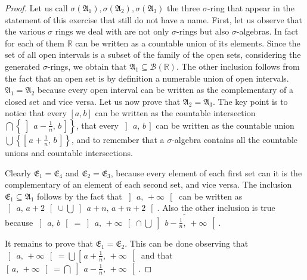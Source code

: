 \documentclass[12pt,a4paper]{article} %
\theoremstyle{plain}
\newcommand\A{\ensuremath{\mathfrak A}}                               %
\newcommand\E{\ensuremath{\mathfrak E}}                               %
\newcommand\R{\ensuremath{\mathbb R}}                                 %
\newcommand\icc[2]{\ensuremath{\left[\,#1,\,#2\,\right]}}
\newcommand\ico[2]{\ensuremath{\left[\,#1,\,#2\,\right[}}
\newcommand\ioc[2]{\ensuremath{\left]\,#1,\,#2\,\right]}}
\newcommand\ioo[2]{\ensuremath{\left]\,#1,\,#2\,\right[}}
\begin{document}
\begin{proof}
  Let us call $\sigma({\A_1}), \sigma({\A_2}), \sigma({\A_3})$ the three $\sigma$-ring that appear in the statement of this exercise that still do not have a name.
  First, let us observe that the various $\sigma$ rings we deal with are not only $\sigma$-rings but also $\sigma$-algebras.
  In fact for each of them $\R$ can be written as a countable union of its elements.
  Since the set of all open intervals is a subset of the family of the open sets, considering the generated $\sigma$-rings, we obtain that $\A_1 \subseteq \mathcal{B}(\R)$. 
  The other inclusion follows from the fact that an open set is by definition a numerable union of open intervals.
  $\A_1 = \A_2$ because every open interval can be written as the complementary of a closed set and vice versa.
  Let us now prove that $\A_2 = \A_3$.
  The key point is to notice that every $[a,b]$ can be written as the countable intersection $\bigcap \left\lbrace \ioc{a-\frac{1}{n}}{b}\right\rbrace$, that every $\ioc{a}{b}$ can be written as the countable union $\bigcup \left\lbrace \icc{a+\frac{1}{n}}{b}\right\rbrace$, and to remember that a $\sigma$-algebra contains all the countable unions and countable intersections.

  Clearly $\E_1 = \E_4$ and $\E_2 = \E_3$, because every element of each first set can it is the complementary of an element of each second set, and vice versa.
  The inclusion $\E_1 \subseteq \A_1$ follows by the fact that $\ioo{a}{+\infty}$ can be written as $\ioo{a}{a + 2} \cup \bigcup \ioo{a+n}{a+n+2}$. 
  Also the other inclusion is true because $\ioo{a}{b} = \ioo{a}{+\infty} \cap \bigcup \widetilde{\ioo{b-\frac{1}{n}}{+\infty}}$.

It remains to prove that $\E_1 = \E_2$. 
This can be done observing that $\ioo{a}{+\infty} = \bigcup \ico{a+\frac{1}{n}}{+\infty}$ and that $\ico{a}{+\infty} = \bigcap \ioo{a-\frac{1}{n}}{+\infty}$.
\end{proof}
\end{document}
